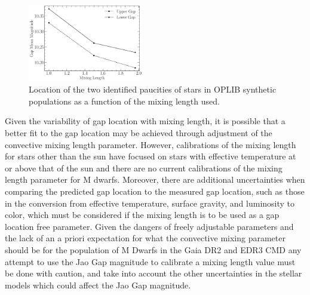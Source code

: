 \begin{figure}
	\centering
	\includegraphics[width=0.45\textwidth]{figures/jaoOpacity/./MixingLengthScaling.pdf}
	\caption{Location of the two identified paucities of stars in OPLIB synthetic
	populations as a function of the mixing length used.}
	\label{fig:MixingLengthScaling}
\end{figure}

Given the variability of gap location with mixing length, it is possible that a
better fit to the gap location may be achieved through adjustment of the
convective mixing length parameter. However, calibrations of the mixing length
for stars other than the sun have focused on stars with effective temperature
at or above that of the sun and there are no current calibrations of the mixing
length parameter for M dwarfs. Moreover, there are additional uncertainties
when comparing the predicted gap location to the measured gap location, such as
those in the conversion from effective temperature, surface gravity, and
luminosity to color, which must be considered if the mixing length is to be
used as a gap location free parameter. Given the dangers of freely adjustable
parameters and the lack of an a priori expectation for what the convective
mixing parameter should be for the population of M Dwarfs in the Gaia DR2 and
EDR3 CMD any attempt to use the Jao Gap magnitude to calibrate a mixing length
value must be done with caution, and take into account the other uncertainties
in the stellar models which could affect the Jao Gap magnitude.


